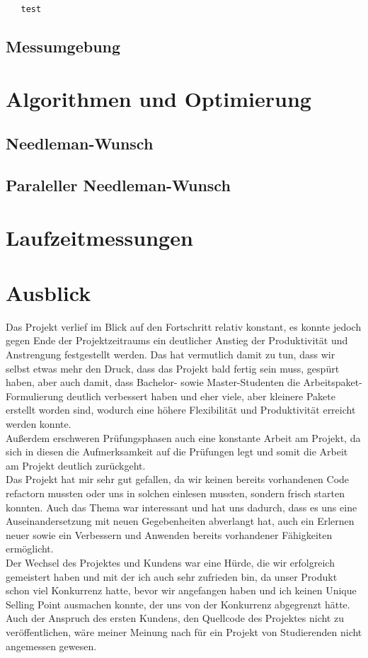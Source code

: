 \documentclass[a4paper]{article}
\begin{document}
\begin{verbatim}
   test
\end{verbatim}

\subsection{Messumgebung}

\section{Algorithmen und Optimierung}
\subsection{Needleman-Wunsch}
\subsection{Paraleller Needleman-Wunsch}

\section{Laufzeitmessungen}



\section{Ausblick}
Das Projekt verlief im Blick auf den Fortschritt relativ konstant, es konnte jedoch gegen Ende der Projektzeitraums ein deutlicher Anstieg der Produktivität und Anstrengung festgestellt werden. Das hat vermutlich damit zu tun, dass wir selbst etwas mehr den Druck, dass das Projekt bald fertig sein muss, gespürt haben, aber auch damit, dass Bachelor- sowie Master-Studenten die Arbeitspaket-Formulierung deutlich verbessert haben und eher viele, aber kleinere Pakete erstellt worden sind, wodurch eine höhere Flexibilität und Produktivität erreicht werden konnte. \\
Außerdem erschweren Prüfungsphasen auch eine konstante Arbeit am Projekt, da sich in diesen die Aufmerksamkeit auf die Prüfungen legt und somit die Arbeit am Projekt deutlich zurückgeht.\\
Das Projekt hat mir sehr gut gefallen, da wir keinen bereits vorhandenen Code refactorn mussten oder uns in solchen einlesen mussten, sondern frisch starten konnten. Auch das Thema war interessant und hat uns dadurch, dass es uns eine Auseinandersetzung mit neuen Gegebenheiten abverlangt hat, auch ein Erlernen neuer sowie ein Verbessern und Anwenden bereits vorhandener Fähigkeiten ermöglicht. \\
Der Wechsel des Projektes und Kundens war eine Hürde, die wir erfolgreich gemeistert haben und mit der ich auch sehr zufrieden bin, da unser Produkt schon viel Konkurrenz hatte, bevor wir angefangen haben und ich keinen Unique Selling Point ausmachen konnte, der uns von der Konkurrenz abgegrenzt hätte. Auch der Anspruch des ersten Kundens, den Quellcode des Projektes  nicht zu veröffentlichen, wäre meiner Meinung nach für ein Projekt von Studierenden nicht angemessen gewesen.
\end{document}
